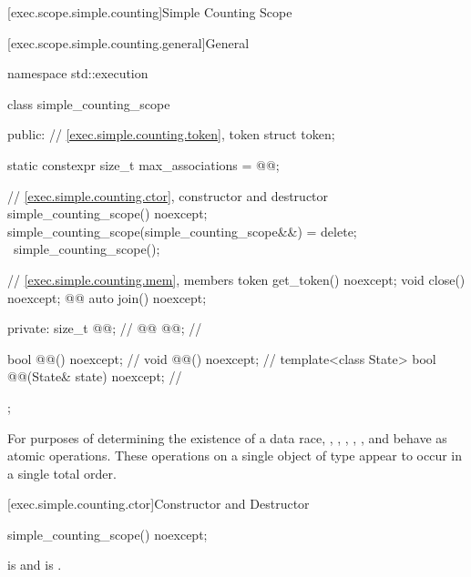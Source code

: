 [exec.scope.simple.counting]{Simple Counting Scope}

[exec.scope.simple.counting.general]{General}

%
\begin{codeblock}
namespace std::execution {
  class simple_counting_scope {
  public:
    // \ref{exec.simple.counting.token}, token
    struct token;

    static constexpr size_t max_associations = @@;

    // \ref{exec.simple.counting.ctor}, constructor and destructor
    simple_counting_scope() noexcept;
    simple_counting_scope(simple_counting_scope&&) = delete;
    ~simple_counting_scope();

    // \ref{exec.simple.counting.mem}, members
    token get_token() noexcept;
    void close() noexcept;
    @@ auto join() noexcept;

  private:
    size_t @@;                                       // \expos
    @@ @@;                             // \expos

    bool @@() noexcept;                      // \expos
    void @@() noexcept;                       // \expos
    template<class State>
      bool @@(State& state) noexcept;    // \expos
  };
}
\end{codeblock}

\pnum
For purposes of determining the existence of a data race,
,
,
,
,
, and
behave as atomic operations.
These operations on a single object of
type  appear to occur in a single total order.

[exec.simple.counting.ctor]{Constructor and Destructor}

%
\begin{itemdecl}
simple_counting_scope() noexcept;
\end{itemdecl}

\begin{itemdescr}
\pnum
\ensures
{} is  and  is .
\end{itemdescr}

